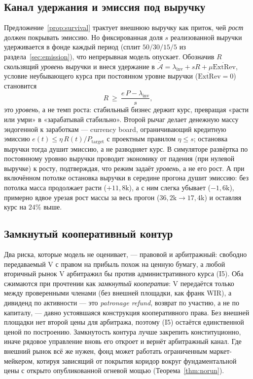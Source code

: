 \documentclass[11pt]{article}
\theoremstyle{plain}
\theoremstyle{definition}
\theoremstyle{remark}
\newcommand{\V}{\mathrm{V}}
\newcommand{\ExtRev}{\mathrm{ExtRev}}
\begin{document}
\subsection{Канал удержания и эмиссия под выручку}

Предложение~\ref{prop:survival} трактует внешнюю выручку как приток, чей \emph{рост} должен покрывать эмиссию. Но фиксированная доля $s$ реализованной выручки удерживается в фонде каждый период (сплит $50/30/15/5$ из раздела~\ref{sec:emission}), что непрерывная модель опускает. Обозначив $R$ скользящий \emph{уровень} выручки и внеся удержание в $\dot{\mathcal A}=\lambda_{\mathrm{inv}}+sR+\mu\dot{\ExtRev}$, условие неубывающего курса при постоянном уровне выручки ($\dot{\ExtRev}=0$) становится
\[
R \ \ge\ \frac{e\,P-\lambda_{\mathrm{inv}}}{s},
\]
это \emph{уровень}, а не темп роста: стабильный бизнес держит курс, превращая «расти или умри» в «зарабатывай стабильно». Второй рычаг делает денежную массу эндогенной к заработкам --- currency board, ограничивающий кредитную эмиссию $e(t)\le\eta\,R(t)/P_{\mathrm{target}}$ с проектным правилом $\eta\le s$; остановка выручки тогда душит эмиссию, а не разводняет курс. В симуляторе развёртка по постоянному уровню выручки проводит экономику от падения (при нулевой выручке) к росту, подтверждая, что режим задаёт \emph{уровень}, а не его рост. А при включённом потолке остановка выручки в середине прогона душит эмиссию: без потолка масса продолжает расти ($+11{,}8\mathrm{k}$), а с ним слегка убывает ($-1{,}6\mathrm{k}$), примерно вдвое урезая рост массы за весь прогон ($36{,}2\mathrm{k}\to17{,}4\mathrm{k}$) и оставляя курс на $24\%$ выше.

\subsection{Замкнутый кооперативный контур}

Два риска, которые модель не оценивает, --- правовой и арбитражный: свободно передаваемый $\V$ с правом на прибыль похож на ценную бумагу, а любой вторичный рынок $\V$ арбитражил бы против административного курса (I5). Оба сжимаются при прочтении как \emph{замкнутый кооператив}: $\V$ передаётся только между проверенными членами (без внешней площадки, как франк WIR), а дивиденд по активности --- это \emph{patronage refund}, возврат по участию, а не по капиталу, --- давно устоявшаяся конструкция кооперативного права. Без внешней площадки нет второй цены для арбитража, поэтому (I5) остаётся единственной ценой по построению. Замкнутость контура лучше закрепить конституционно, иначе рядовое управление вновь его откроет и вернёт арбитражный канал. Где внешний рынок всё же нужен, фонд может работать ограниченным маркет-мейкером, котируя зависящий от покрытия коридор вокруг фундаментальной цены с открыто опубликованной огневой мощью (Теорема~\ref{thm:norun}).
\end{document}

